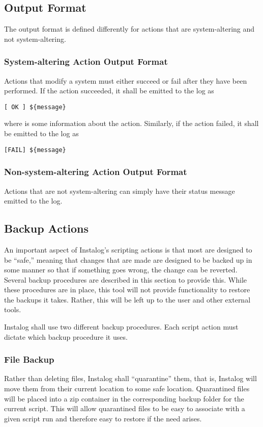 \subsection{Output Format}
The output format is defined differently for actions that are system-altering
and not system-altering.
\subsubsection{System-altering Action Output Format}
Actions that modify a system must either succeed or fail after they have been
performed.  If the action succeeded, it shall be emitted to the log as
\begin{verbatim}
[ OK ] ${message}
\end{verbatim}
where  is some information about the action.  Similarly, if the
action failed, it shall be emitted to the log as
\begin{verbatim}
[FAIL] ${message}
\end{verbatim}
\subsubsection{Non-system-altering Action Output Format}
Actions that are not system-altering can simply have their status message
emitted to the log.

\subsection{Backup Actions}
An important aspect of Instalog's scripting actions is that most are designed to
be ``safe,'' meaning that changes that are made are designed to be backed up in
some manner so that if something goes wrong, the change can be reverted. 
Several backup procedures are described in this section to provide this.  While
these procedures are in place, this tool will not provide functionality to
restore the backups it takes.  Rather, this will be left up to the user and
other external tools.

Instalog shall use two different backup procedures.  Each script action must
dictate which backup procedure it uses.  
\subsubsection{File Backup}
Rather than deleting files, Instalog shall ``quarantine'' them, that is,
Instalog will move them from their current location to some safe location. 
Quarantined files will be placed into a zip container in the corresponding
backup folder for the current script.  This will allow quarantined files to be
easy to associate with a given script run and therefore easy to restore if the
need arises.  

